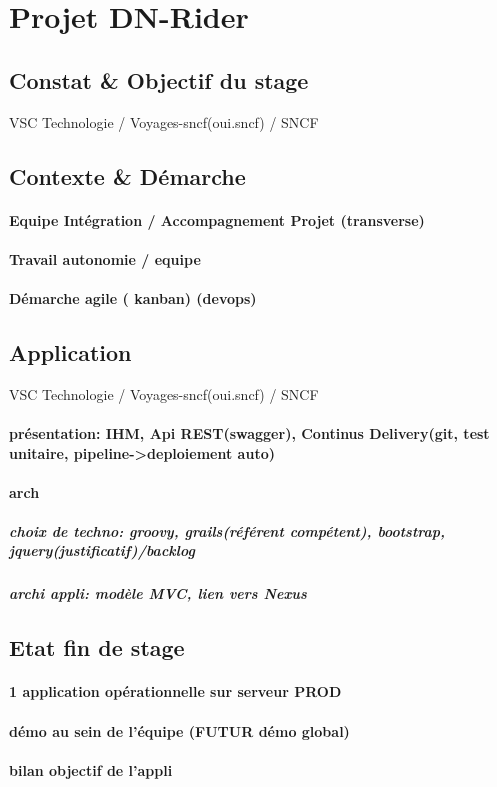 \section{Projet DN-Rider}
\subsection{Constat \& Objectif du stage} VSC Technologie / Voyages-sncf(oui.sncf) / SNCF

\subsection{Contexte \& Démarche}
\paragraph{Equipe Intégration / Accompagnement Projet (transverse)}
\paragraph{Travail autonomie / equipe}
\paragraph{Démarche agile ( kanban) (devops)}

\subsection{Application} VSC Technologie / Voyages-sncf(oui.sncf) / SNCF
\paragraph{présentation: IHM, Api REST(swagger), Continus Delivery(git, test unitaire, pipeline->deploiement auto)}
\paragraph{arch}
\subparagraph{choix de techno: groovy, grails(référent compétent), bootstrap, jquery(justificatif)/backlog}
\subparagraph{archi appli: modèle MVC, lien vers Nexus}

\subsection{Etat fin de stage}
\paragraph{1 application opérationnelle sur serveur PROD}
\paragraph{démo au sein de l’équipe (FUTUR démo global)}
\paragraph{bilan objectif de l’appli}
